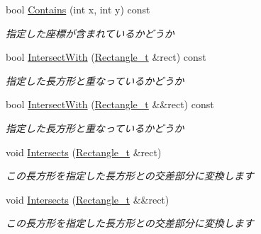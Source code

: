 \begin{DoxyCompactItemize}
bool \hyperlink{struct_rectangle__t_a54f6d0cb15367365eb987d672dc1c949}{Contains} (int x, int y) const 
\begin{DoxyCompactList}\small\item\em 指定した座標が含まれているかどうか\end{DoxyCompactList}\item 
bool \hyperlink{struct_rectangle__t_a86cc029602e881c2b69fb5189acf6304}{Intersect\+With} (\hyperlink{struct_rectangle__t}{Rectangle\+\_\+t} \&rect) const 
\begin{DoxyCompactList}\small\item\em 指定した長方形と重なっているかどうか \end{DoxyCompactList}\item 
bool \hyperlink{struct_rectangle__t_ab85dd06db91a326dd840e25aca8f7544}{Intersect\+With} (\hyperlink{struct_rectangle__t}{Rectangle\+\_\+t} \&\&rect) const 
\begin{DoxyCompactList}\small\item\em 指定した長方形と重なっているかどうか\end{DoxyCompactList}\item 
void \hyperlink{struct_rectangle__t_a042347cae1e12ad6e2a1d75a492c8ff0}{Intersects} (\hyperlink{struct_rectangle__t}{Rectangle\+\_\+t} \&rect)
\begin{DoxyCompactList}\small\item\em この長方形を指定した長方形との交差部分に変換します\end{DoxyCompactList}\item 
void \hyperlink{struct_rectangle__t_aacc81f628ec164e5508444d9635d1ff7}{Intersects} (\hyperlink{struct_rectangle__t}{Rectangle\+\_\+t} \&\&rect)
\begin{DoxyCompactList}\small\item\em この長方形を指定した長方形との交差部分に変換します\end{DoxyCompactList}\end{DoxyCompactItemize}

